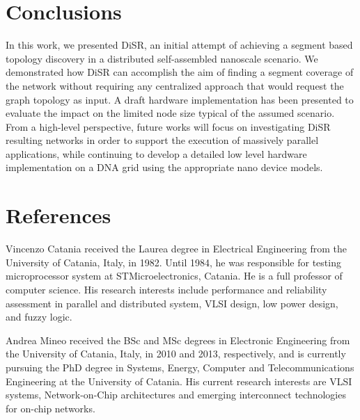 \documentclass[preprint]{elsarticle}
\newcommand{\disr}{{\sf DiSR}}
\begin{document}







\section{Conclusions}
In this work, we presented \disr{}, an initial attempt of achieving a segment based
topology discovery in a distributed self-assembled nanoscale scenario. We
demonstrated how \disr{} can accomplish the aim of finding a segment
coverage of the network without requiring any centralized approach
that would request the graph topology as input. A draft hardware
implementation has been presented to evaluate the impact on the limited
node size typical of the assumed scenario. From a high-level
perspective, future works will focus on
investigating \disr{} resulting networks in order to support the
execution of massively parallel applications, while continuing to
develop a detailed low level hardware implementation on a
DNA grid using the appropriate nano device models.


%
% 
%

%
\section*{References}

\vspace{10 mm}

Vincenzo Catania received the Laurea degree in Electrical Engineering
from the University of Catania, Italy, in 1982. Until 1984, he was
responsible for testing microprocessor system at STMicroelectronics,
Catania. He is a full professor of computer
science. His research interests include performance and reliability
assessment in parallel and distributed system, VLSI design, low power
design, and fuzzy logic.

Andrea Mineo received the BSc and MSc degrees in Electronic
Engineering from the University of Catania, Italy, in 2010 and 2013,
respectively, and is currently pursuing the PhD degree in Systems,
Energy, Computer and Telecommunications Engineering at the University
of Catania. His current research interests are VLSI systems,
Network-on-Chip architectures and emerging interconnect technologies
for on-chip networks.
\end{document}
